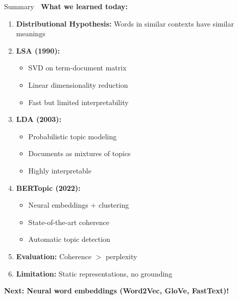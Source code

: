 \documentclass[aspectratio=169]{beamer}
\begin{document}
\begin{frame}[shrink=10]{Summary 🎯}
\textbf{What we learned today:}

\begin{enumerate}\setlength{\itemsep}{0pt}
    \item \textbf{Distributional Hypothesis:} Words in similar contexts have similar meanings

    \item \textbf{LSA (1990):}
    \begin{itemize}\setlength{\itemsep}{0pt}
        \item SVD on term-document matrix
        \item Linear dimensionality reduction
        \item Fast but limited interpretability
    \end{itemize}

    \item \textbf{LDA (2003):}
    \begin{itemize}\setlength{\itemsep}{0pt}
        \item Probabilistic topic modeling
        \item Documents as mixtures of topics
        \item Highly interpretable
    \end{itemize}

    \item \textbf{BERTopic (2022):}
    \begin{itemize}\setlength{\itemsep}{0pt}
        \item Neural embeddings + clustering
        \item State-of-the-art coherence
        \item Automatic topic detection
    \end{itemize}

    \item \textbf{Evaluation:} Coherence $>$ perplexity

    \item \textbf{Limitation:} Static representations, no grounding
\end{enumerate}

\vspace{1em}
\begin{center}
\textbf{Next: Neural word embeddings (Word2Vec, GloVe, FastText)!}
\end{center}
\end{frame}
\end{document}
